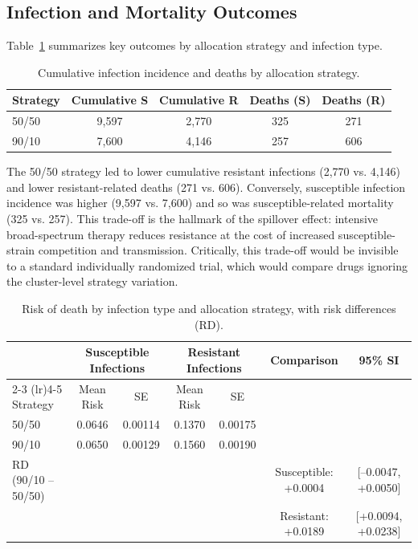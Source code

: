 \subsection{Infection and Mortality Outcomes}

Table~\ref{tab:outcomes} summarizes key outcomes by allocation strategy and infection type.

\begin{table}[htbp]
\centering
\caption{Cumulative infection incidence and deaths by allocation strategy.}
\label{tab:outcomes}
\begin{tabular}{lcccc}
\toprule
\textbf{Strategy} & \textbf{Cumulative S} & \textbf{Cumulative R} & \textbf{Deaths (S)} & \textbf{Deaths (R)} \\
\midrule
50/50 & 9,597 & 2,770 & 325 & 271 \\
90/10 & 7,600 & 4,146 & 257 & 606 \\
\bottomrule
\end{tabular}
\end{table}

The 50/50 strategy led to lower cumulative resistant infections (2,770 vs. 4,146) and lower resistant-related deaths
(271 vs. 606). Conversely, susceptible infection incidence was higher (9,597 vs. 7,600) and so was susceptible-related mortality
(325 vs. 257). This trade-off is the hallmark of the spillover effect: intensive broad-spectrum therapy reduces resistance
at the cost of increased susceptible-strain competition and transmission. Critically, this trade-off would be invisible to
a standard individually randomized trial, which would compare drugs ignoring the cluster-level strategy variation.

\begin{table}[ht]
\centering
\caption{Risk of death by infection type and allocation strategy, with risk differences (RD).}
\label{tab:risk_summary}
\begin{tabular}{lcccccc}
\toprule
& \multicolumn{2}{c}{Susceptible Infections} & \multicolumn{2}{c}{Resistant Infections} &
\multirow{2}{*}{Comparison} & \multirow{2}{*}{95\% SI} \\
\cmidrule(lr){2-3} \cmidrule(lr){4-5}
Strategy & Mean Risk & SE & Mean Risk & SE &  &  \\
\midrule
50/50 & 0.0646 & 0.00114 & 0.1370 & 0.00175 &  &  \\
90/10 & 0.0650 & 0.00129 & 0.1560 & 0.00190 &  &  \\
\midrule
RD (90/10 -- 50/50) &  &  &  &  & Susceptible: +0.0004 & [--0.0047, +0.0050] \\
&  &  &  &  & Resistant: +0.0189 & [+0.0094, +0.0238] \\
\bottomrule
\end{tabular}
\end{table}


